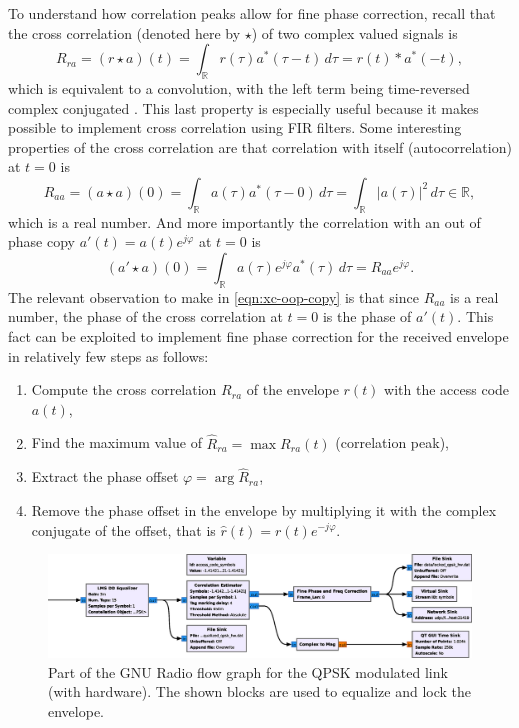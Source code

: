 To understand how correlation peaks allow for fine phase correction, recall that the cross correlation (denoted here by \(\star\)) of two complex valued signals is
\begin{equation}
	R_{ra}
	= (r \star a)(t)
	= \int_\mathbb{R} r(\tau) a^*(\tau - t) \,d\tau
	= r(t) * a^*(-t),
\end{equation}
which is equivalent to a convolution, with the left term being time-reversed complex conjugated \cite{Gallager}. This last property is especially useful because it makes possible to implement cross correlation using FIR filters. Some interesting properties of the cross correlation are that correlation with itself (autocorrelation) at \(t = 0\) is
\begin{equation}
	R_{aa} = (a \star a)(0)
	= \int_\mathbb{R} a(\tau) a^*(\tau - 0) \,d\tau
	= \int_\mathbb{R} |a(\tau)|^2 \,d\tau \in \mathbb{R},
\end{equation}
which is a real number. And more importantly the correlation with an out of phase copy \(a'(t) = a(t) e^{j\varphi}\) at \(t = 0\) is
\begin{equation} \label{eqn:xc-oop-copy}
	(a' \star a)(0) 
	= \int_\mathbb{R} a(\tau)e^{j\varphi}  a^*(\tau) \,d\tau
	= R_{aa} e^{j\varphi}.
\end{equation}
The relevant observation to make in \eqref{eqn:xc-oop-copy} is that since \(R_{aa}\) is a real number, the phase of the cross correlation at \(t = 0\) is the phase of \(a'(t)\). This fact can be exploited to implement fine phase correction for the received envelope in relatively few steps as follows:
\begin{enumerate}
	\item Compute the cross correlation \(R_{ra}\) of the envelope \(r(t)\) with the access code \(a(t)\),
	\item Find the maximum value of \(\hat{R}_{ra} = \max R_{ra}(t)\) (correlation peak),
	\item Extract the phase offset \(\varphi = \arg \hat{R}_{ra}\),
	\item Remove the phase offset in the envelope by multiplying it with the complex conjugate of the offset, that is \(\hat{r}(t) = r(t) e^{-j\varphi}\).
\end{enumerate}

\begin{figure}
	\centering
	\includegraphics[width = .95\linewidth]{figures/screenshots/sync_lock}
	\caption{
		Part of the GNU Radio flow graph for the QPSK modulated link (with hardware). The shown blocks are used to equalize and lock the envelope.
		\label{fig:sync-lock-flowgraph}
	}
\end{figure}

